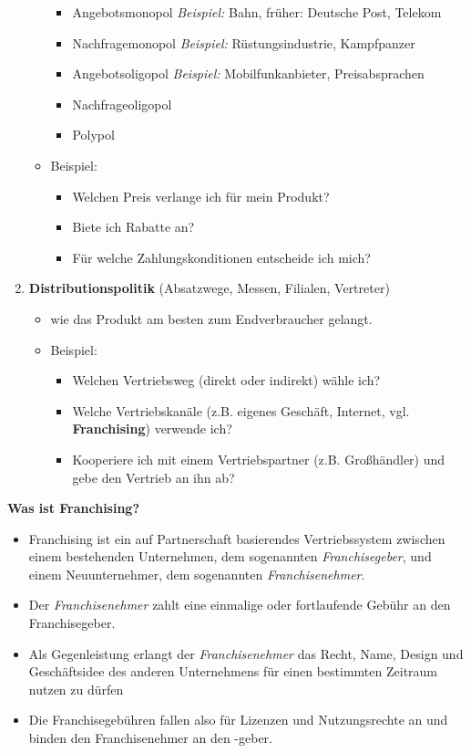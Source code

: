 \begin{enumerate}
\begin{itemize}
    \begin{itemize}
    \item
      Angebotsmonopol \emph{Beispiel:} Bahn, früher: Deutsche Post,
      Telekom
    \item
      Nachfragemonopol \emph{Beispiel:} Rüstungsindustrie, Kampfpanzer
    \item
      Angebotsoligopol \emph{Beispiel:} Mobilfunkanbieter,
      Preisabsprachen
    \item
      Nachfrageoligopol
    \item
      Polypol
    \end{itemize}
  \item
    Beispiel:

    \begin{itemize}
    \item
      Welchen Preis verlange ich für mein Produkt?
    \item
      Biete ich Rabatte an?
    \item
      Für welche Zahlungskonditionen entscheide ich mich?
    \end{itemize}
  \end{itemize}
\item
  \textbf{Distributionspolitik} (Absatzwege, Messen, Filialen,
  Vertreter)

  \begin{itemize}
  \item
    wie das Produkt am besten zum Endverbraucher gelangt.
  \item
    Beispiel:

    \begin{itemize}
    \item
      Welchen Vertriebsweg (direkt oder indirekt) wähle ich?
    \item
      Welche Vertriebskanäle (z.B. eigenes Geschäft, Internet, vgl.
      \textbf{Franchising}) verwende ich?
    \item
      Kooperiere ich mit einem Vertriebspartner (z.B. Großhändler) und
      gebe den Vertrieb an ihn ab?
    \end{itemize}
  \end{itemize}
\end{enumerate}

\textbf{Was ist Franchising?}

\begin{itemize}
\item
  Franchising ist ein auf Partnerschaft basierendes Vertriebssystem
  zwischen einem bestehenden Unternehmen, dem sogenannten
  \emph{Franchisegeber}, und einem Neuunternehmer, dem sogenannten
  \emph{Franchisenehmer}.
\item
  Der \emph{Franchisenehmer} zahlt eine einmalige oder fortlaufende
  Gebühr an den Franchisegeber.
\item
  Als Gegenleistung erlangt der \emph{Franchisenehmer} das Recht, Name,
  Design und Geschäftsidee des anderen Unternehmens für einen bestimmten
  Zeitraum nutzen zu dürfen
\item
  Die Franchisegebühren fallen also für Lizenzen und Nutzungsrechte an
  und binden den Franchisenehmer an den -geber.
\end{itemize}

